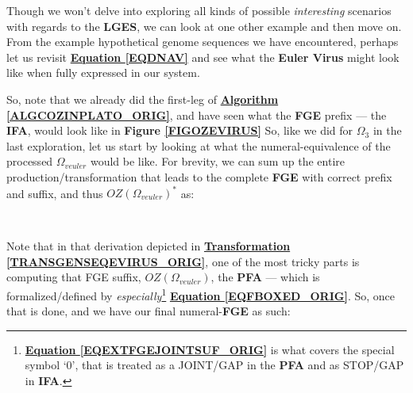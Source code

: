 \documentclass[a4paper, 18pt]{book} %
\newtheorem{trans}{Transformation}
\begin{document}
\begin{appendices}
Though we won't delve into exploring all kinds of possible \textit{interesting} scenarios with regards to the \textbf{LGES}, we can look at one other example and then move on. From the example hypothetical genome sequences we have encountered, perhaps let us revisit \textbf{\hyperref[EQDNAV]{Equation \ref{EQDNAV}}} and see what the \textbf{Euler Virus} might look like when fully expressed in our system.

So, note that we already did the first-leg of \textbf{\hyperref[ALGCOZINPLATO_ORIG]{Algorithm \ref{ALGCOZINPLATO_ORIG}}}, and have seen what the \textbf{FGE} prefix --- the \textbf{IFA}, would look like in \textbf{Figure \ref{FIGOZEVIRUS}} So, like we did for $\Omega_{3}$ in the last exploration, let us start by looking at what the numeral-equivalence of the processed $\Omega_{veuler}$ would be like. For brevity, we can sum up the entire production/transformation that leads to the complete \textbf{FGE} with correct prefix and suffix, and thus $\boxed{OZ(\Omega_{veuler})}^*$ as:

\begin{center}
\\
\end{center}


Note that in that derivation depicted in \textbf{\hyperref[TRANSGENSEQEVIRUS_ORIG]{Transformation \ref{TRANSGENSEQEVIRUS_ORIG}}}, one of the most tricky parts is computing that FGE suffix, $\boxed{OZ(\Omega_{veuler})}$, the \textbf{PFA} --- which is formalized/defined by \textit{especially}\footnote{\textbf{\hyperref[EQEXTFGEJOINTSUF_ORIG]{Equation \ref{EQEXTFGEJOINTSUF_ORIG}}} is what covers the special symbol `0', that is treated as a JOINT/GAP in the \textbf{PFA} and as STOP/GAP in \textbf{IFA}.} \textbf{\hyperref[EQFBOXED_ORIG]{Equation \ref{EQFBOXED_ORIG}}}. So, once that is done, and we have our final numeral-\textbf{FGE} as such:


\end{appendices}
\end{document}
